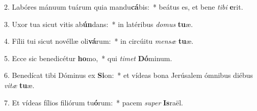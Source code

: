 2. Labóres mánuum tuárum quia mandu\textbf{cá}bis:~*  beátus es, et bene \textit{ti}\textit{bi} \textbf{e}rit.\

3. Uxor tua sicut vitis ab\textbf{ún}dans:~*  in latéribus \textit{do}\textit{mus} \textbf{tu}æ.\

4. Fílii tui sicut novéllæ oli\textbf{vá}rum:~*  in circúitu \textit{men}\textit{sæ} \textbf{tu}æ.\

5. Ecce sic benedicétur \textbf{ho}mo,~*  qui \textit{ti}\textit{met} \textbf{Dó}minum.\

6. Benedícat tibi Dóminus ex \textbf{Si}on:~*  et vídeas bona Jerúsalem ómnibus diébus \textit{vi}\textit{tæ} \textbf{tu}æ.\

7. Et vídeas fílios filiórum tu\textbf{ó}rum:~*  pacem \textit{su}\textit{per} \textbf{Is}raël.\

